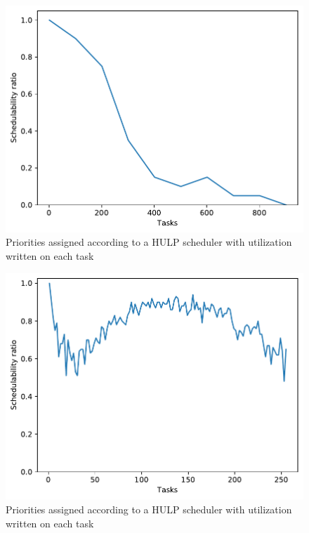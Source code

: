 \documentclass{kththesis}
\begin{document}
\begin{figure}[H]

    \centering

    \includegraphics[width=0.8\linewidth]{images/task_amount_2.pdf}

    \caption{Priorities assigned according to a HULP scheduler with utilization written on each task}

    \label{fig:task_amount_2}

\end{figure}

\begin{figure}

    \centering

    \includegraphics[width=0.8\linewidth]{images/task_amount_1.pdf}

    \caption{Priorities assigned according to a HULP scheduler with utilization written on each task}

    \label{fig:task_amount_1}

\end{figure}
\end{document}
